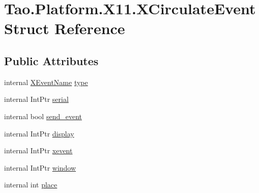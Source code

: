 \hypertarget{struct_tao_1_1_platform_1_1_x11_1_1_x_circulate_event}{
\section{Tao.Platform.X11.XCirculateEvent Struct Reference}
\label{struct_tao_1_1_platform_1_1_x11_1_1_x_circulate_event}
}
\subsection*{Public Attributes}
\begin{DoxyCompactItemize}
\item 
internal \hyperlink{namespace_tao_1_1_platform_1_1_x11_aff81ed5b8778e1ea8e872861dff9f146}{XEventName} \hyperlink{struct_tao_1_1_platform_1_1_x11_1_1_x_circulate_event_aea427c3d36e1b7a2d1d7a175fe97d91b}{type}
\item 
internal IntPtr \hyperlink{struct_tao_1_1_platform_1_1_x11_1_1_x_circulate_event_a6f3b3f1350d192b03c3af66badefef26}{serial}
\item 
internal bool \hyperlink{struct_tao_1_1_platform_1_1_x11_1_1_x_circulate_event_ad9836a0d6942782610aee17ac631f743}{send\_\-event}
\item 
internal IntPtr \hyperlink{struct_tao_1_1_platform_1_1_x11_1_1_x_circulate_event_a552ca78f6f769dd236b6ea37b4414a68}{display}
\item 
internal IntPtr \hyperlink{struct_tao_1_1_platform_1_1_x11_1_1_x_circulate_event_a02a4d1779273ecf9632d68b832e2597c}{xevent}
\item 
internal IntPtr \hyperlink{struct_tao_1_1_platform_1_1_x11_1_1_x_circulate_event_aa5d6993f4cef39b9bbf93e70cbbea197}{window}
\item 
internal int \hyperlink{struct_tao_1_1_platform_1_1_x11_1_1_x_circulate_event_a85261f358d9a0d06eb1d12cb3c1519f8}{place}
\end{DoxyCompactItemize}


